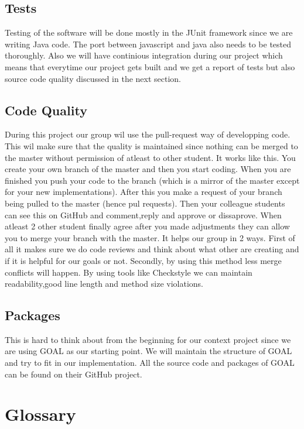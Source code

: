 \documentclass[]{article}
\begin{document}
\subsection{Tests}
Testing of the software will be done mostly in the JUnit framework since we are writing Java code. The port between javascript and java also needs to be tested thoroughly. Also we will have continious integration during our project which means that everytime our project gets built and we get a report of tests but also source code quality discussed in the next section.

\subsection{Code Quality}
During this project our group wil use the pull-request way of developping code. This wil make sure that the quality is maintained since nothing can be merged to the master without permission of atleast to other student. It works like this. You create your own branch of the master and then you start coding. When you are finished you push your code to the branch (which is a mirror of the master except for your new implementations). After this you make a request of your branch being pulled to the master (hence pul requests). Then your colleague students can see this on GitHub and comment,reply and approve or dissaprove. When atleast 2 other student finally agree after you made adjustments they can allow you to merge your branch with the master. It helps our group in 2 ways. First of all it makes sure we do code reviews and think about what other are creating and if it is helpful for our goals or not. Secondly, by using this method less merge conflicts will happen.
By using tools like Checkstyle we can maintain readability,good line length and method size violations.

\subsection{Packages}
This is hard to think about from the beginning for our context project since we are using GOAL as our starting point. We will maintain the structure of GOAL and try to fit in our implementation. All the source code and packages of GOAL can be found on their GitHub project.
\pagebreak
\section{Glossary}
\printnoidxglossaries
\end{document}
